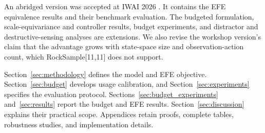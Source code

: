 An abridged version was accepted at IWAI 2026 \citep{cooper2026iwai}. It contains the EFE equivalence results and their benchmark evaluation. The budgeted formulation, scale-equivariance and controller results, budget experiments, and distractor and destructive-sensing analyses are extensions. We also revise the workshop version's claim that the advantage grows with state-space size and observation-action count, which RockSample[11,11] does not support.

Section~\ref{sec:methodology} defines the model and EFE objective. Section~\ref{sec:budget} develops usage calibration, and Section~\ref{sec:experiments} specifies the evaluation protocol. Sections~\ref{sec:budget_experiments} and~\ref{sec:results} report the budget and EFE results. Section~\ref{sec:discussion} explains their practical scope. Appendices retain proofs, complete tables, robustness studies, and implementation details.
